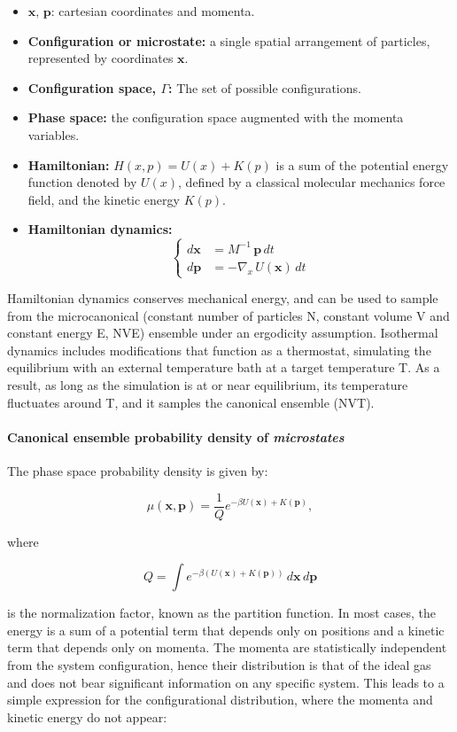 \begin{itemize}
    \item $\mathbf{x}, \, \mathbf{p}$: cartesian coordinates and momenta.
    \item \textbf{Configuration or microstate:} a single spatial arrangement of particles, represented by coordinates $\mathbf{x}$.
    \item \textbf{Configuration space, $\Gamma$:} The set of possible configurations.
    \item \textbf{Phase space:} the configuration space augmented with the momenta variables.
    \item \textbf{Hamiltonian:} $H(x,p) = U(x) + K(p)$ is a sum of the potential energy function denoted by $U(x)$, defined by a classical molecular mechanics force field, and the kinetic energy $K(p)$.
    \item \textbf{Hamiltonian dynamics:} 
    $$
    \begin{cases}
    d\mathbf{x} &= M^{-1}\,\mathbf{p}\,dt \\
    d\mathbf{p} &= -\nabla_x \,U(\mathbf{x})\,dt
    \end{cases}
    $$
\end{itemize}

\noindent Hamiltonian dynamics conserves mechanical energy, and can be used to sample from the microcanonical (constant number of particles N, constant volume V and constant energy E, NVE) ensemble under an ergodicity assumption.
Isothermal dynamics includes modifications that function as a thermostat, simulating the equilibrium with an external temperature bath at a target temperature T. 
As a result, as long as the simulation is at or near equilibrium, its temperature fluctuates around T, and it samples the canonical ensemble (NVT).

\paragraph{Canonical ensemble probability density of \textit{microstates}}
The phase space probability density is given by:

$$
\mu(\mathbf{x}, \mathbf{p}) = \frac{1}{Q} e^{-\beta U(\mathbf{x}) + K(\mathbf{p})},
$$

where

$$
Q = \int e^{-\beta (U(\mathbf{x}) + K(\mathbf{p}))} \, d\mathbf{x} \, d\mathbf{p}
$$

is the normalization factor, known as the partition function. In most cases, the energy is a sum of a potential term that depends only on positions and a kinetic term that depends only on momenta. The momenta are statistically independent from the system configuration, hence their distribution is that of the ideal gas and does not bear significant information on any specific system. This leads to a simple expression for the configurational distribution, where the momenta and kinetic energy do not appear:

